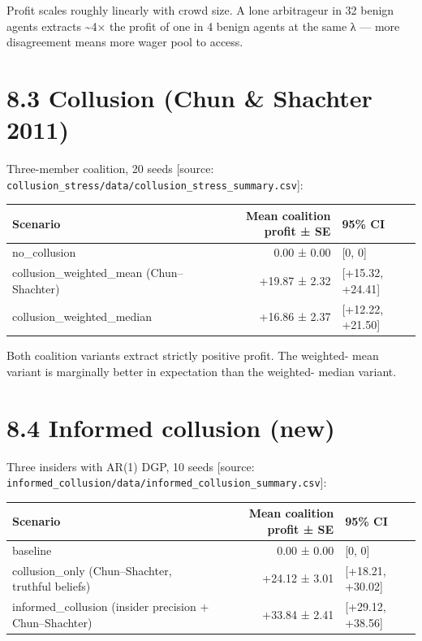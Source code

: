 \documentclass[11pt,a4paper,openany]{report}
\begin{document}
Profit scales roughly linearly with crowd size. A lone arbitrageur in
32 benign agents extracts \textasciitilde{}4× the profit of one in 4 benign agents at
the same λ — more disagreement means more wager pool to access.

\section{8.3 Collusion (Chun \& Shachter 2011)}

Three-member coalition, 20 seeds [source:
\texttt{collusion\_stress/data/collusion\_stress\_summary.csv}]:

\begin{center}
\small
\begin{tabular}{lrl}
\toprule
\textbf{Scenario} & \textbf{Mean coalition profit ± SE} & \textbf{95\% CI} \\
\midrule
no\_collusion & 0.00 ± 0.00 & [0, 0] \\
collusion\_weighted\_mean (Chun–Shachter) & +19.87 ± 2.32 & [+15.32, +24.41] \\
collusion\_weighted\_median & +16.86 ± 2.37 & [+12.22, +21.50] \\
\bottomrule
\end{tabular}
\end{center}

Both coalition variants extract strictly positive profit. The weighted-
mean variant is marginally better in expectation than the weighted-
median variant.

\section{8.4 Informed collusion (new)}

Three insiders with AR(1) DGP, 10 seeds [source:
\texttt{informed\_collusion/data/informed\_collusion\_summary.csv}]:

\begin{center}
\small
\begin{tabular}{lrl}
\toprule
\textbf{Scenario} & \textbf{Mean coalition profit ± SE} & \textbf{95\% CI} \\
\midrule
baseline & 0.00 ± 0.00 & [0, 0] \\
collusion\_only (Chun–Shachter, truthful beliefs) & +24.12 ± 3.01 & [+18.21, +30.02] \\
informed\_collusion (insider precision + Chun–Shachter) & +33.84 ± 2.41 & [+29.12, +38.56] \\
\bottomrule
\end{tabular}
\end{center}
\end{document}
